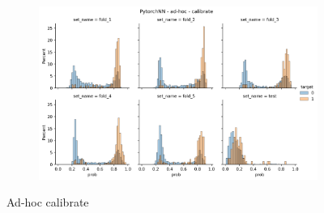\begin{figure}
\begin{subfigure}[b]{0.83\textwidth}
        \centering
        \includegraphics[width=\linewidth]{figures/results/ad-hoc/nn/2021-12-06_17.03.17.314982__distplot.png}
    \end{subfigure}
    \caption{Ad-hoc calibrate}
\end{figure}

